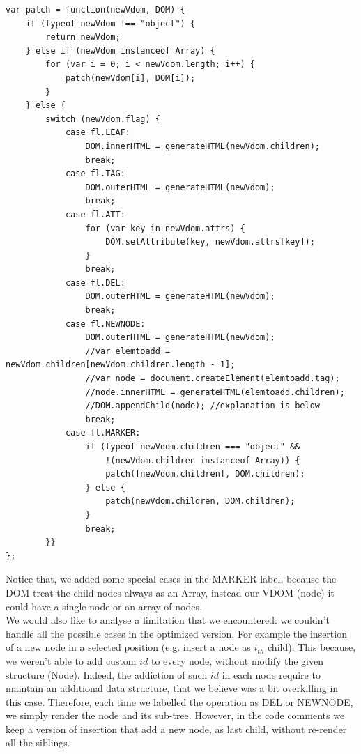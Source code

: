 \documentclass[10pt]{article}
\begin{document}
\begin{lstlisting}[caption=\textit{patch} function]
var patch = function(newVdom, DOM) {
    if (typeof newVdom !== "object") {
        return newVdom;
    } else if (newVdom instanceof Array) {
        for (var i = 0; i < newVdom.length; i++) {
            patch(newVdom[i], DOM[i]);
        }
    } else {
        switch (newVdom.flag) {
            case fl.LEAF:
                DOM.innerHTML = generateHTML(newVdom.children);
                break;
            case fl.TAG:
                DOM.outerHTML = generateHTML(newVdom);
                break;
            case fl.ATT:
                for (var key in newVdom.attrs) {
                    DOM.setAttribute(key, newVdom.attrs[key]);
                }
                break;
            case fl.DEL:
                DOM.outerHTML = generateHTML(newVdom);
                break;
            case fl.NEWNODE:
                DOM.outerHTML = generateHTML(newVdom);
                //var elemtoadd = newVdom.children[newVdom.children.length - 1];
                //var node = document.createElement(elemtoadd.tag);
                //node.innerHTML = generateHTML(elemtoadd.children);
                //DOM.appendChild(node); //explanation is below 
                break;
            case fl.MARKER:
                if (typeof newVdom.children === "object" &&
                    !(newVdom.children instanceof Array)) {
                    patch([newVdom.children], DOM.children);
                } else {
                    patch(newVdom.children, DOM.children);
                }
                break;
        }}
};
\end{lstlisting} 
Notice that, we added some special cases in the MARKER label, because the DOM treat the child nodes always as an Array, instead our VDOM (node) it could have a single node or an array of nodes.\\ 
We would also like to analyse a limitation that we encountered: we couldn't handle all the possible cases in the optimized version. For example the insertion of a new node in a selected position (e.g. insert a node as $i_{th}$ child). This because, we weren't able to add custom $id$ to every node, without modify the given structure (Node). Indeed, the addiction of such $id$ in each node require to maintain an additional data structure, that we believe was a bit overkilling in this case. Therefore, each time we labelled the operation as DEL or NEWNODE, we simply render the node and its sub-tree. However, in the code comments we keep a version of insertion that add a new node, as last child, without re-render all the siblings.
\end{document}
